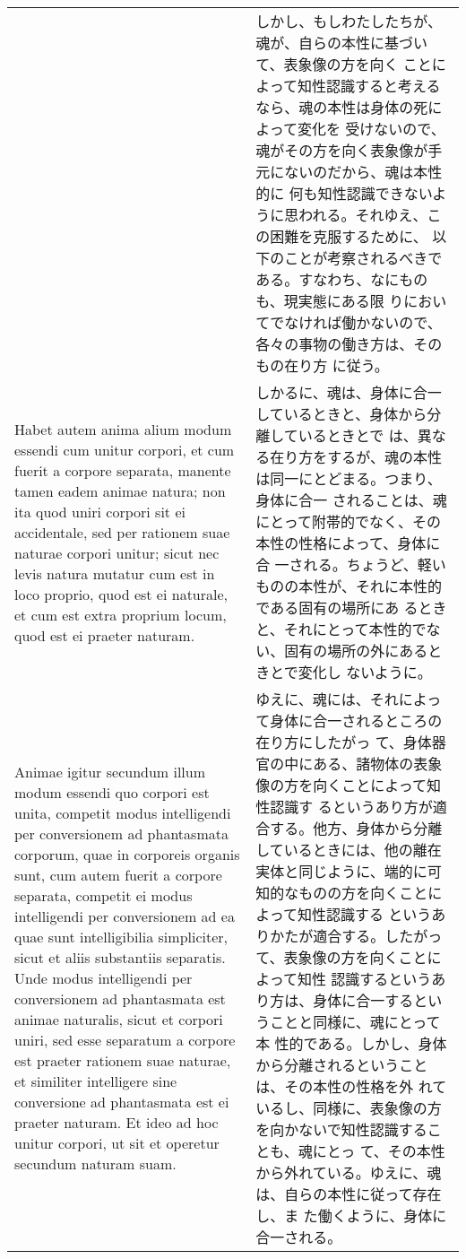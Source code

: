 \documentclass[10pt]{jsarticle} %
\begin{document}
\begin{longtable}{p{21em}p{21em}}
&

しかし、もしわたしたちが、魂が、自らの本性に基づいて、表象像の方を向く
ことによって知性認識すると考えるなら、魂の本性は身体の死によって変化を
受けないので、魂がその方を向く表象像が手元にないのだから、魂は本性的に
何も知性認識できないように思われる。それゆえ、この困難を克服するために、
以下のことが考察されるべきである。すなわち、なにものも、現実態にある限
りにおいてでなければ働かないので、各々の事物の働き方は、そのもの在り方
に従う。

\\

Habet autem anima alium modum essendi cum unitur corpori, et cum
fuerit a corpore separata, manente tamen eadem animae natura; non ita
quod uniri corpori sit ei accidentale, sed per rationem suae naturae
corpori unitur; sicut nec levis natura mutatur cum est in loco
proprio, quod est ei naturale, et cum est extra proprium locum, quod
est ei praeter naturam.

&

しかるに、魂は、身体に合一しているときと、身体から分離しているときとで
は、異なる在り方をするが、魂の本性は同一にとどまる。つまり、身体に合一
されることは、魂にとって附帯的でなく、その本性の性格によって、身体に合
一される。ちょうど、軽いものの本性が、それに本性的である固有の場所にあ
るときと、それにとって本性的でない、固有の場所の外にあるときとで変化し
ないように。

\\

Animae igitur secundum illum modum essendi quo corpori est unita,
competit modus intelligendi per conversionem ad phantasmata corporum,
quae in corporeis organis sunt, cum autem fuerit a corpore separata,
competit ei modus intelligendi per conversionem ad ea quae sunt
intelligibilia simpliciter, sicut et aliis substantiis separatis. Unde
modus intelligendi per conversionem ad phantasmata est animae
naturalis, sicut et corpori uniri, sed esse separatum a corpore est
praeter rationem suae naturae, et similiter intelligere sine
conversione ad phantasmata est ei praeter naturam. Et ideo ad hoc
unitur corpori, ut sit et operetur secundum naturam suam.

&ゆえに、魂には、それによって身体に合一されるところの在り方にしたがっ
て、身体器官の中にある、諸物体の表象像の方を向くことによって知性認識す
るというあり方が適合する。他方、身体から分離しているときには、他の離在
実体と同じように、端的に可知的なものの方を向くことによって知性認識する
というありかたが適合する。したがって、表象像の方を向くことによって知性
認識するというあり方は、身体に合一するということと同様に、魂にとって本
性的である。しかし、身体から分離されるということは、その本性の性格を外
れているし、同様に、表象像の方を向かないで知性認識することも、魂にとっ
て、その本性から外れている。ゆえに、魂は、自らの本性に従って存在し、ま
た働くように、身体に合一される。


\end{longtable}
\end{document}
